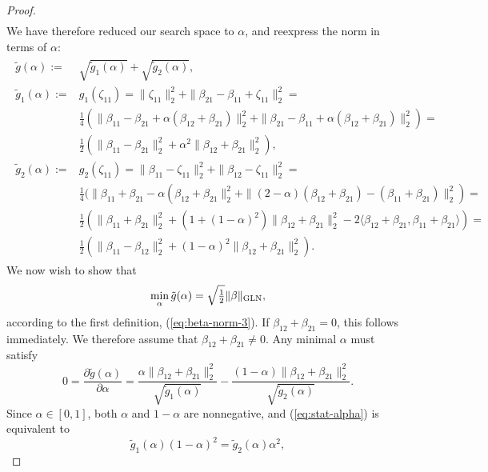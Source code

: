 \documentclass{article}
\theoremstyle{plain}
\theoremstyle{definition}
\theoremstyle{remark}
\begin{document}
\begin{proof}
\begin{align*}
\end{align*}
We have therefore reduced our search space to $\alpha$, and reexpress the norm in terms of $\alpha$:
\begin{align}
\begin{aligned}
    \tilde{g}(\alpha):=&\sqrt{\tilde{g}_1(\alpha)}+\sqrt{\tilde{g}_2(\alpha)},\\
    \tilde{g}_1(\alpha):=&g_1(\zeta_{11})=\|\zeta_{11}\|_2^2+\|\beta_{21}-\beta_{11}+\zeta_{11}\|_2^2=\\
    &\tfrac14(\|\beta_{11}-\beta_{21}+\alpha(\beta_{12}+\beta_{21})\|_2^2+\|\beta_{21}-\beta_{11}+\alpha(\beta_{12}+\beta_{21})\|_2^2)=\\
    &\tfrac12(\|\beta_{11}-\beta_{21}\|_2^2+\alpha^2\|\beta_{12}+\beta_{21}\|_2^2),\\
    \tilde{g}_2(\alpha):=&g_2(\zeta_{11})=\|\beta_{11}-\zeta_{11}\|_2^2+\|\beta_{12}-\zeta_{11}\|_2^2=\\
    &\tfrac14(\|\beta_{11}+\beta_{21}-\alpha(\beta_{12}+\beta_{21}\|_2^2+
    \|(2-\alpha)(\beta_{12}+\beta_{21})-(\beta_{11}+\beta_{21})\|_2^2)=\\
    &\tfrac12(\|\beta_{11}+\beta_{21}\|_2^2+(1+(1-\alpha)^2)\|\beta_{12}+\beta_{21}\|_2^2-
    2\langle\beta_{12}+\beta_{21},\beta_{11}+\beta_{21}\rangle)=\\
    &\tfrac12(\|\beta_{11}-\beta_{12}\|_2^2+(1-\alpha)^2\|\beta_{12}+\beta_{21}\|_2^2).
\end{aligned}
\end{align}
We now wish to show that
\begin{equation}
\label{eq:beta-norm-3-zz}
\min_{\alpha}\tilde{g}(\alpha)=\sqrt{\tfrac12}\|\beta\|_{\rm GLN},
\end{equation}
according to the first definition, (\ref{eq:beta-norm-3}).
If $\beta_{12}+\beta_{21}=0$, this follows immediately.
We therefore assume that $\beta_{12}+\beta_{21}\neq0$.
Any minimal $\alpha$ must satisfy
\begin{equation}
\label{eq:stat-alpha}
    0=\frac{\partial\tilde{g}(\alpha)}{\partial\alpha}=\frac{\alpha\|\beta_{12}+\beta_{21}\|_2^2}{\sqrt{\tilde{g}_1(\alpha)}}-\frac{(1-\alpha)\|\beta_{12}+\beta_{21}\|_2^2}{\sqrt{\tilde{g}_2(\alpha)}}.
\end{equation}
Since $\alpha\in[0,1]$, both $\alpha$ and $1-\alpha$ are nonnegative, and (\ref{eq:stat-alpha}) is equivalent to
\begin{equation}
    \tilde{g}_1(\alpha)(1-\alpha)^2=\tilde{g}_2(\alpha)\alpha^2,
\end{equation}

\end{proof}
\end{document}
